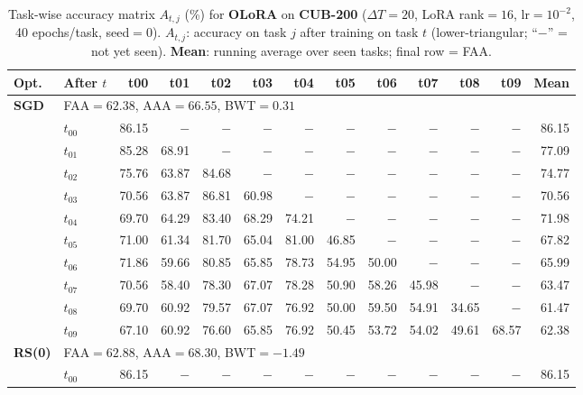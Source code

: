 \begin{table}[ht]
\centering
\caption{%
  Task-wise accuracy matrix $A_{t,j}$ (\%) for \textbf{OLoRA} on \textbf{CUB-200} ($\Delta T=20$, LoRA rank$=16$, lr$=10^{-2}$, 40 epochs/task, seed$=0$).
  $A_{t,j}$: accuracy on task $j$ after training on task $t$  (lower-triangular; ``$-$'' = not yet seen).
  \textbf{Mean}: running average over seen tasks; final row = FAA.
}
\label{tab:raw_olora_cub200}
\setlength{\tabcolsep}{2.8pt}
\renewcommand{\arraystretch}{0.88}
\scriptsize
\begin{tabular}{@{}l l r r r r r r r r r r r@{}}
\toprule
\textbf{Opt.} & \textbf{After $t$} & \textbf{t00} & \textbf{t01} & \textbf{t02} & \textbf{t03} & \textbf{t04} & \textbf{t05} & \textbf{t06} & \textbf{t07} & \textbf{t08} & \textbf{t09} & \textbf{Mean} \\
\midrule
\multirow{11}{*}{\textbf{SGD}} & \multicolumn{12}{l}{\quad\small FAA$=62.38$,\; AAA$=66.55$,\; BWT$=0.31$} \\
 & $t_{00}$ & 86.15 & $-$ & $-$ & $-$ & $-$ & $-$ & $-$ & $-$ & $-$ & $-$ & 86.15 \\
 & $t_{01}$ & 85.28 & 68.91 & $-$ & $-$ & $-$ & $-$ & $-$ & $-$ & $-$ & $-$ & 77.09 \\
 & $t_{02}$ & 75.76 & 63.87 & 84.68 & $-$ & $-$ & $-$ & $-$ & $-$ & $-$ & $-$ & 74.77 \\
 & $t_{03}$ & 70.56 & 63.87 & 86.81 & 60.98 & $-$ & $-$ & $-$ & $-$ & $-$ & $-$ & 70.56 \\
 & $t_{04}$ & 69.70 & 64.29 & 83.40 & 68.29 & 74.21 & $-$ & $-$ & $-$ & $-$ & $-$ & 71.98 \\
 & $t_{05}$ & 71.00 & 61.34 & 81.70 & 65.04 & 81.00 & 46.85 & $-$ & $-$ & $-$ & $-$ & 67.82 \\
 & $t_{06}$ & 71.86 & 59.66 & 80.85 & 65.85 & 78.73 & 54.95 & 50.00 & $-$ & $-$ & $-$ & 65.99 \\
 & $t_{07}$ & 70.56 & 58.40 & 78.30 & 67.07 & 78.28 & 50.90 & 58.26 & 45.98 & $-$ & $-$ & 63.47 \\
 & $t_{08}$ & 69.70 & 60.92 & 79.57 & 67.07 & 76.92 & 50.00 & 59.50 & 54.91 & 34.65 & $-$ & 61.47 \\
 & $t_{09}$ & 67.10 & 60.92 & 76.60 & 65.85 & 76.92 & 50.45 & 53.72 & 54.02 & 49.61 & 68.57 & 62.38 \\
\midrule
\multirow{11}{*}{\textbf{RS(0)}} & \multicolumn{12}{l}{\quad\small FAA$=62.88$,\; AAA$=68.30$,\; BWT$=-1.49$} \\
 & $t_{00}$ & 86.15 & $-$ & $-$ & $-$ & $-$ & $-$ & $-$ & $-$ & $-$ & $-$ & 86.15 \\

\end{tabular}
\end{table}
